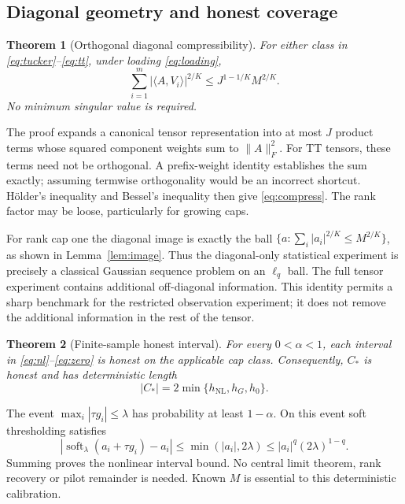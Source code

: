 \documentclass[11pt]{article}
\newtheorem{theorem}{Theorem}
\theoremstyle{remark}
\newcommand{\ip}[2]{\langle #1,#2\rangle}
\newcommand{\norm}[1]{\lVert #1\rVert}
\newcommand{\soft}{\operatorname{soft}}
\newcommand{\NL}{\mathrm{NL}}
\begin{document}
\subsection{Diagonal geometry and honest coverage}

\begin{theorem}[Orthogonal diagonal compressibility]\label{thm:diagonal}
For either class in \eqref{eq:tucker}--\eqref{eq:tt}, under loading \eqref{eq:loading},
\begin{equation}\label{eq:compress}
 \sum_{i=1}^m|\ip A{V_i}|^{2/K}\le J^{1-1/K}M^{2/K}.
\end{equation}
No minimum singular value is required.
\end{theorem}

The proof expands a canonical tensor representation into at most $J$ product terms whose squared component weights sum to $\norm A_F^2$. For TT tensors, these terms need not be orthogonal. A prefix-weight identity establishes the sum exactly; assuming termwise orthogonality would be an incorrect shortcut. H\"older's inequality and Bessel's inequality then give \eqref{eq:compress}. The rank factor may be loose, particularly for growing caps.

For rank cap one the diagonal image is exactly the ball $\{a:\sum_i|a_i|^{2/K}\le M^{2/K}\}$, as shown in Lemma~\ref{lem:image}. Thus the diagonal-only statistical experiment is precisely a classical Gaussian sequence problem on an $\ell_q$ ball. The full tensor experiment contains additional off-diagonal information. This identity permits a sharp benchmark for the restricted observation experiment; it does not remove the additional information in the rest of the tensor.

\begin{theorem}[Finite-sample honest interval]\label{thm:coverage}
For every $0<\alpha<1$, each interval in \eqref{eq:nl}--\eqref{eq:zero} is honest on the applicable cap class. Consequently, $C_*$ is honest and has deterministic length
\begin{equation}\label{eq:length}
 |C_*|=2\min\{h_{\NL},h_G,h_0\}.
\end{equation}
\end{theorem}

The event $\max_i|\tau g_i|\le\lambda$ has probability at least $1-\alpha$. On this event soft thresholding satisfies
\[
 |\soft_\lambda(a_i+\tau g_i)-a_i|\le\min(|a_i|,2\lambda)
 \le |a_i|^q(2\lambda)^{1-q}.
\]
Summing proves the nonlinear interval bound. No central limit theorem, rank recovery or pilot remainder is needed. Known $M$ is essential to this deterministic calibration.
\end{document}
